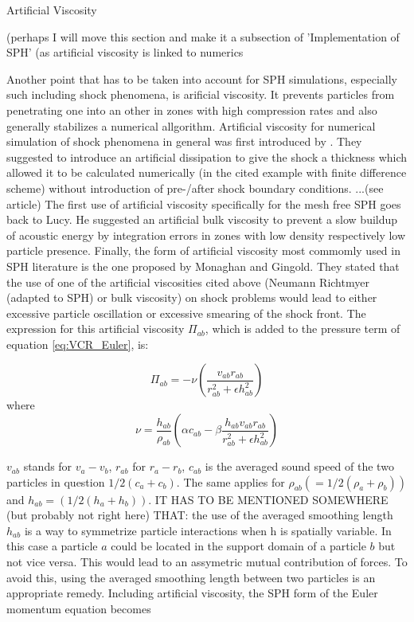 \documentclass{report}
\begin{document}
Artificial Viscosity

(perhaps I will move this section and make it a subsection of 'Implementation of SPH' (as artificial viscosity is linked to numerics

Another point that has to be taken into account for SPH simulations, especially
such including shock phenomena, is arificial viscosity\cite{Monaghan2005}. It
prevents particles from penetrating one into an other in zones with high
compression rates and also generally stabilizes a numerical
allgorithm.
Artificial viscosity for numerical simulation of shock phenomena
in general was first introduced by \cite{vonNeumann1950}. They suggested to
introduce an artificial dissipation to give the shock a thickness which
allowed it to be calculated numerically (in the cited example with finite difference
scheme) without introduction of pre-/after shock boundary conditions.    ...(see article)
The first use of artificial viscosity specifically for the mesh free SPH goes
back to Lucy\cite{Lucy1977}. He suggested an artificial bulk viscosity to
prevent a slow buildup of acoustic energy by integration errors in zones with
low density respectively low particle presence. 
Finally, the form of artificial viscosity most commomly used in SPH
literature\cite{Liu2003} is the one proposed by Monaghan and
Gingold\cite{Monaghan1983}. They stated that the use of one of the artificial
viscosities cited above (Neumann Richtmyer (adapted to SPH) or bulk
viscosity) on shock problems would lead to either excessive particle
oscillation or excessive smearing of the shock front. The expression for this
artificial viscosity $\Pi_{ab}$, which is added to the pressure term of
equation \ref{eq:VCR_Euler}, is:

\begin{equation}
\label{eq:MonArtVis}
\Pi _{\mathit{ab}}=-\nu
\left(\frac{v_{\mathit{ab}}r_{\mathit{ab}}}{r_{\mathit{ab}}^{2}+\epsilon
h_{\mathit{ab}}^{2}}\right)
\end{equation}
where 
\begin{equation}
\label{eq:FactArtVis}
\nu =\frac{h_{\mathit{ab}}}{\rho _{\mathit{ab}}}\left(\alpha
c_{\mathit{ab}}-\beta
\frac{h_{\mathit{ab}}v_{\mathit{ab}}r_{\mathit{ab}}}{r_{\mathit{ab}}^{2}+\epsilon
h_{\mathit{ab}}^{2}}\right)
\end{equation}

$v_{ab}$ stands for $v_a-v_b$, $r_{ab}$ for $r_a-r_b$, $c_{ab}$ is the
averaged sound speed of the two particles in question $1/2(c_a+c_b)$. The same
applies for $\rho_{ab}(=1/2(\rho_a+\rho_b))$ and $h_{ab}=(1/2(h_a+h_b))$. IT
HAS TO BE MENTIONED SOMEWHERE (but probably not right here) THAT: the use of
the averaged smoothing length $h_{ab}$ is a way to symmetrize particle
interactions when h is spatially variable. In this case a particle $a$ could be
located in the support domain of a particle $b$ but not vice versa. This would
lead to an assymetric mutual contribution of forces. To avoid this, using the
averaged smoothing length between two particles is an appropriate remedy\cite{Liu2003}.
Including artificial viscosity, the SPH form of the Euler momentum equation becomes\cite{Monaghan2005}
\end{document}
